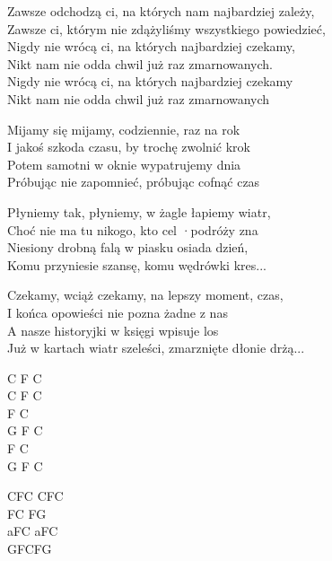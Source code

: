 \begin{text}
    \small{
    Zawsze odchodzą ci, na których nam najbardziej zależy,\\
    Zawsze ci, którym nie zdążyliśmy wszystkiego powiedzieć,\\
    Nigdy nie wrócą ci, na których najbardziej czekamy,\\
    Nikt nam nie odda chwil już raz zmarnowanych.\\
    Nigdy nie wrócą ci, na których najbardziej czekamy\\
    Nikt nam nie odda chwil już raz zmarnowanych

    Mijamy się mijamy, codziennie, raz na rok\\
    I jakoś szkoda czasu, by trochę zwolnić krok\\
    Potem samotni w oknie wypatrujemy dnia\\
    Próbując nie zapomnieć, próbując cofnąć czas

    Płyniemy tak, płyniemy, w żagle łapiemy wiatr,\\
    Choć nie ma tu nikogo, kto cel ·podróży zna\\
    Niesiony drobną falą w piasku osiada dzień,\\
    Komu przyniesie szansę, komu wędrówki kres...

    Czekamy, wciąż czekamy, na lepszy moment, czas,\\
    I końca opowieści nie pozna żadne z nas\\
    A nasze historyjki w księgi wpisuje los\\
    Już w kartach wiatr szeleści, zmarznięte dłonie drżą...
    }
\end{text}
\begin{chord}
    \small{
    C F C\\
    C F C\\
    F C\\
    G F C\\
    F C\\
    G F C

    CFC CFC\\
    FC FG\\
    aFC aFC\\
    GFCFG
    }
\end{chord}